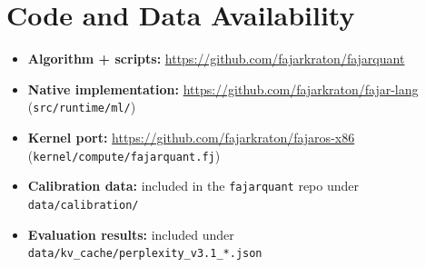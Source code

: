 \documentclass[10pt]{article}
\begin{document}
\section{Code and Data Availability}

\begin{itemize}[nosep]
\item \textbf{Algorithm + scripts:} \url{https://github.com/fajarkraton/fajarquant}
\item \textbf{Native implementation:} \url{https://github.com/fajarkraton/fajar-lang} (\texttt{src/runtime/ml/})
\item \textbf{Kernel port:} \url{https://github.com/fajarkraton/fajaros-x86} (\texttt{kernel/compute/fajarquant.fj})
\item \textbf{Calibration data:} included in the \texttt{fajarquant} repo under \texttt{data/calibration/}
\item \textbf{Evaluation results:} included under \texttt{data/kv\_cache/perplexity\_v3.1\_*.json}
\end{itemize}
\end{document}

